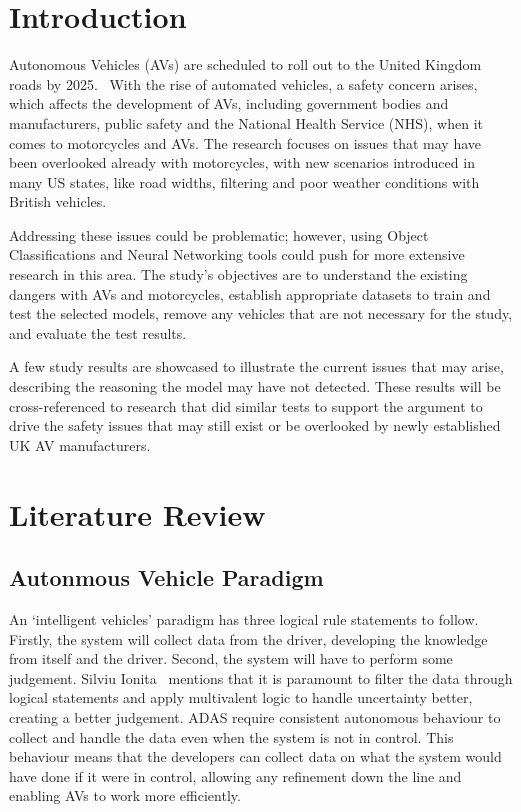 \documentclass[conference]{IEEEtran}
\begin{document}
\section{Introduction}
	Autonomous Vehicles (AVs) are scheduled to roll out to the United Kingdom roads by 2025.~\cite{govuk_self-driving_2022} With the rise of automated vehicles, a safety concern arises, which affects the development of AVs, including government bodies and manufacturers, public safety and the National Health Service (NHS), when it comes to motorcycles and AVs. The research focuses on issues that may have been overlooked already with motorcycles, with new scenarios introduced in many US states, like road widths, filtering and poor weather conditions with British vehicles. 

	Addressing these issues could be problematic; however, using Object Classifications and Neural Networking tools could push for more extensive research in this area. The study's objectives are to understand the existing dangers with AVs and motorcycles, establish appropriate datasets to train and test the selected models, remove any vehicles that are not necessary for the study, and evaluate the test results.

	A few study results are showcased to illustrate the current issues that may arise, describing the reasoning the model may have not detected. These results will be cross-referenced to research that did similar tests to support the argument to drive the safety issues that may still exist or be overlooked by newly established UK AV manufacturers.

\section{Literature Review}
	\subsection{Autonmous Vehicle Paradigm}
		An `intelligent vehicles' paradigm has three logical rule statements to follow. Firstly, the system will collect data from the driver, developing the knowledge from itself and the driver. Second, the system will have to perform some judgement. Silviu Ionita~\cite{ionita_autonomous_2017} mentions that it is paramount to filter the data through logical statements and apply multivalent logic to handle uncertainty better, creating a better judgement. ADAS require consistent autonomous behaviour to collect and handle the data even when the system is not in control. This behaviour means that the developers can collect data on what the system would have done if it were in control, allowing any refinement down the line and enabling AVs to work more efficiently.
\end{document}
